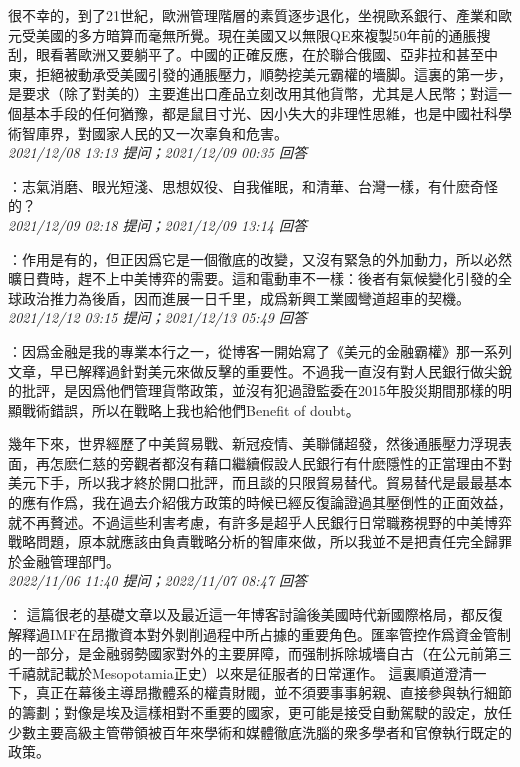\documentclass[twocolumn]{ctexart}
\begin{document}
很不幸的，到了21世紀，歐洲管理階層的素質逐步退化，坐視歐系銀行、產業和歐元受美國的多方暗算而毫無所覺。現在美國又以無限QE來複製50年前的通脹搜刮，眼看著歐洲又要躺平了。中國的正確反應，在於聯合俄國、亞非拉和甚至中東，拒絕被動承受美國引發的通脹壓力，順勢挖美元霸權的墻脚。這裏的第一步，是要求（除了對美的）主要進出口產品立刻改用其他貨幣，尤其是人民幣；對這一個基本手段的任何猶豫，都是鼠目寸光、因小失大的非理性思維，也是中國社科學術智庫界，對國家人民的又一次辜負和危害。
\\

\textit{\hfill\noindent\small 2021/12/08 13:13 提问；2021/12/09 00:35 回答}

：志氣消磨、眼光短淺、思想奴役、自我催眠，和清華、台灣一樣，有什麽奇怪的？
\\

\textit{\hfill\noindent\small 2021/12/09 02:18 提问；2021/12/09 13:14 回答}

：作用是有的，但正因爲它是一個徹底的改變，又沒有緊急的外加動力，所以必然曠日費時，趕不上中美博弈的需要。這和電動車不一樣：後者有氣候變化引發的全球政治推力為後盾，因而進展一日千里，成爲新興工業國彎道超車的契機。
\\

\textit{\hfill\noindent\small 2021/12/12 03:15 提问；2021/12/13 05:49 回答}

：因爲金融是我的專業本行之一，從博客一開始寫了《美元的金融霸權》那一系列文章，早已解釋過針對美元來做反擊的重要性。不過我一直沒有對人民銀行做尖銳的批評，是因爲他們管理貨幣政策，並沒有犯過證監委在2015年股災期間那樣的明顯戰術錯誤，所以在戰略上我也給他們Benefit of doubt。

幾年下來，世界經歷了中美貿易戰、新冠疫情、美聯儲超發，然後通脹壓力浮現表面，再怎麽仁慈的旁觀者都沒有藉口繼續假設人民銀行有什麽隱性的正當理由不對美元下手，所以我才終於開口批評，而且談的只限貿易替代。貿易替代是最最基本的應有作爲，我在過去介紹俄方政策的時候已經反復論證過其壓倒性的正面效益，就不再贅述。不過這些利害考慮，有許多是超乎人民銀行日常職務視野的中美博弈戰略問題，原本就應該由負責戰略分析的智庫來做，所以我並不是把責任完全歸罪於金融管理部門。
\\

\textit{\hfill\noindent\small 2022/11/06 11:40 提问；2022/11/07 08:47 回答}

：
這篇很老的基礎文章以及最近這一年博客討論後美國時代新國際格局，都反復解釋過IMF在昂撒資本對外剝削過程中所占據的重要角色。匯率管控作爲資金管制的一部分，是金融弱勢國家對外的主要屏障，而强制拆除城墻自古（在公元前第三千禧就記載於Mesopotamia正史）以來是征服者的日常運作。
這裏順道澄清一下，真正在幕後主導昂撒體系的權貴財閥，並不須要事事躬親、直接參與執行細節的籌劃；對像是埃及這樣相對不重要的國家，更可能是接受自動駕駛的設定，放任少數主要高級主管帶領被百年來學術和媒體徹底洗腦的衆多學者和官僚執行既定的政策。
\\
\end{document}
